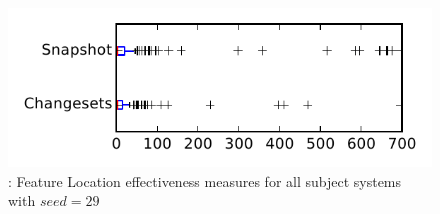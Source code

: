 
\begin{figure}
\centering
\includegraphics[height=0.4\textheight]{figures/flt_seed/rq1_tiny_29}
\caption{\rone: Feature Location effectiveness measures for all subject systems with $seed=29$}
\label{fig:flt_seed:rq1:tiny}
\end{figure}
